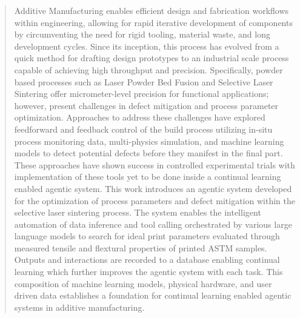 \begin{abstract}
Additive Manufacturing enables efficient design and fabrication workflows within
engineering, allowing for rapid iterative development of components by
circumventing the need for rigid tooling, material waste, and long development
cycles. Since its inception, this process has evolved from a quick method for
drafting design prototypes to an industrial scale process capable of achieving
high throughput and precision. Specifically, powder based processes such as
Laser Powder Bed Fusion and Selective Laser Sintering offer micrometer-level
precision for functional applications; however, present challenges in defect
mitigation and process parameter optimization. Approaches to address these
challenges have explored feedforward and feedback control of the build process
utilizing in-situ process monitoring data, multi-physics simulation, and machine
learning models to detect potential defects before they manifest in the final
part. These approaches have shown success in controlled experimental trials with
implementation of these tools yet to be done inside a continual learning enabled
agentic system. This work introduces an agentic system developed for the
optimization of process parameters and defect mitigation within the selective
laser sintering process. The system enables the intelligent automation of data
inference and tool calling orchestrated by various large language models to
search for ideal print parameters evaluated through measured tensile and
flextural properties of printed ASTM samples. Outputs and interactions are
recorded to a database enabling continual learning which further improves the
agentic system with each task. This composition of machine learning models,
physical hardware, and user driven data establishes a foundation for continual
learning enabled agentic systems in additive manufacturing.


\end{abstract}
